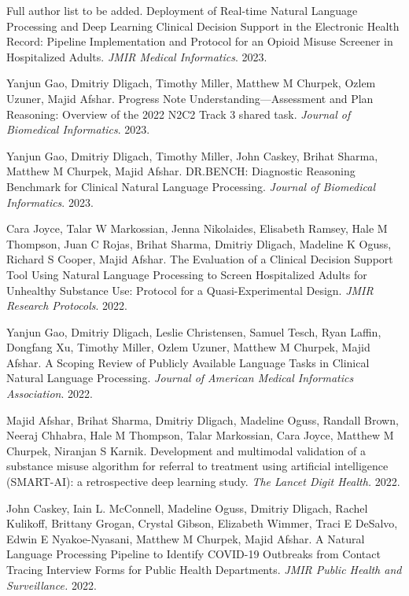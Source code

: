 \documentclass[letterpaper]{article}
\renewenvironment{itemize}{
  \begin{list}{}{
    \setlength{\leftmargin}{1.5em}
  }
}{
  \end{list}
}
\begin{document}
\begin{itemize}
\item Full author list to be added. Deployment of Real-time Natural Language Processing and Deep Learning Clinical Decision Support in the Electronic Health Record: Pipeline Implementation and Protocol for an Opioid Misuse Screener in Hospitalized Adults. \emph{JMIR Medical Informatics}. 2023.
\item Yanjun Gao, Dmitriy Dligach, Timothy Miller, Matthew M Churpek, Ozlem Uzuner, Majid Afshar. Progress Note Understanding—Assessment and Plan Reasoning: Overview of the 2022 N2C2 Track 3 shared task. \emph{Journal of Biomedical Informatics}. 2023.
\item Yanjun Gao, Dmitriy Dligach, Timothy Miller, John Caskey, Brihat Sharma, Matthew M Churpek, Majid Afshar. DR.BENCH: Diagnostic Reasoning Benchmark for Clinical Natural Language Processing. \emph{Journal of Biomedical Informatics}. 2023.
\item Cara Joyce, Talar W Markossian, Jenna Nikolaides, Elisabeth Ramsey, Hale M Thompson, Juan C Rojas, Brihat Sharma, Dmitriy Dligach, Madeline K Oguss, Richard S Cooper, Majid Afshar. The Evaluation of a Clinical Decision Support Tool Using Natural Language Processing to Screen Hospitalized Adults for Unhealthy Substance Use: Protocol for a Quasi-Experimental Design. \emph{JMIR Research Protocols}. 2022.
\item Yanjun Gao, Dmitriy Dligach, Leslie Christensen, Samuel Tesch, Ryan Laffin, Dongfang Xu, Timothy Miller, Ozlem Uzuner, Matthew M Churpek, Majid Afshar. A Scoping Review of Publicly Available Language Tasks in Clinical Natural Language Processing. \emph{Journal of American Medical Informatics Association}. 2022.
\item Majid Afshar, Brihat Sharma, Dmitriy Dligach, Madeline Oguss, Randall Brown, Neeraj Chhabra, Hale M Thompson, Talar Markossian, Cara Joyce, Matthew M Churpek, Niranjan S Karnik. Development and multimodal validation of a substance misuse algorithm for referral to treatment using artificial intelligence (SMART-AI): a retrospective deep learning study. \emph{The Lancet Digit Health.} 2022.
\item John Caskey, Iain L. McConnell, Madeline Oguss, Dmitriy Dligach, Rachel Kulikoff, Brittany Grogan, Crystal Gibson, Elizabeth Wimmer, Traci E DeSalvo, Edwin E Nyakoe-Nyasani, Matthew M Churpek, Majid Afshar. A Natural Language Processing Pipeline to Identify COVID-19 Outbreaks from Contact Tracing Interview Forms for Public Health Departments. \emph{JMIR Public Health and Surveillance.} 2022.

\end{itemize}
\end{document}
